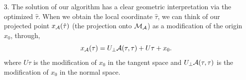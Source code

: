 \documentclass{article}
\theoremstyle{remark}
\begin{document}
3. The solution of our algorithm has a clear geometric interpretation via the optimized $\hat{\tau}$.  When we obtain the local coordinate $\hat{\tau}$, we can think of our projected point $x_{\cal A}(\hat{\tau})$ (the projection onto ${\cal M}_{\cal A}$) as a modification of the origin $x_0$, through,
\[
x_{\cal A}(\tau) = U_\perp {\cal A}(\tau,\tau) + U\tau + x_0. 
\]
where $U\tau$ is the modification of $x_0$ in the tangent space and $U_\perp {\cal A}(\tau,\tau)$ is the modification of $x_0$ in the normal space.
\end{document}
